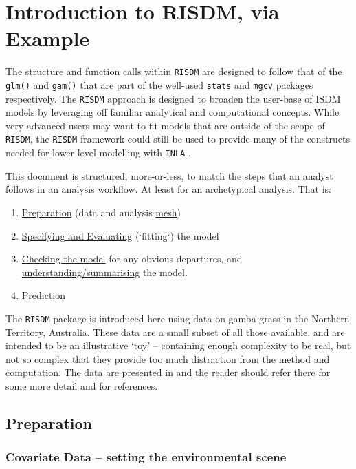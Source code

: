 \documentclass[article,shortnames,nojss]{jss}\usepackage[]{graphicx}\usepackage[]{xcolor}
\begin{document}
\section*{Introduction to RISDM, via Example}

The structure and function calls within \texttt{RISDM} are designed to follow that of the \texttt{glm()} and \texttt{gam()} that are part of the well-used \texttt{stats} \citep{R22} and \texttt{mgcv} \citep{woo17} packages respectively. The \texttt{RISDM} approach is designed to broaden the user-base of ISDM models by leveraging off familiar analytical and computational concepts. While very advanced users may want to fit models that are outside of the scope of \texttt{RISDM}, the \texttt{RISDM} framework could still be used to provide many of the constructs needed for lower-level modelling with \texttt{INLA} \citep{rue09}.

This document is structured, more-or-less, to match the steps that an analyst follows in an analysis workflow. At least for an archetypical analysis. That is: 
\begin{enumerate}
  \item \hyperref[subsec:prep]{Preparation} (data and analysis \hyperref[subsubsec:mesh]{mesh})
  \item \hyperref[subsec:mod]{Specifying and Evaluating} (`fitting`) the model
  \item \hyperref[subsubsec:res]{Checking the model} for any obvious departures, and \hyperref[subsubsec:summ]{understanding/summarising} the model.
  \item \hyperref[subsec:pred]{Prediction}
\end{enumerate}

The \texttt{RISDM} package is introduced here using data on gamba grass in the Northern Territory, Australia. These data are a small subset of all those available, and are intended to be an illustrative `toy' -- containing enough complexity to be real, but not so complex that they provide too much distraction from the method and computation. The data are presented in \citet{fos24} and the reader should refer there for some more detail and for references.

\subsection*{Preparation} \label{subsec:prep}

\subsubsection*{Covariate Data -- setting the environmental scene}\label{subsubsec:covs}
\end{document}
